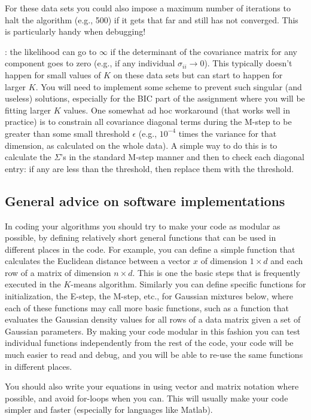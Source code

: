 \documentclass[11pt]{article}
\begin{document}
 
For these data sets you could
also impose a maximum number of iterations to halt the algorithm (e.g.,  
500) if it gets that far and still has not converged. This is particularly
handy when debugging! 

: the likelihood can go to
$\infty$ if the determinant of the covariance matrix for any component goes to zero (e.g., if any
individual $\sigma_{ii} \to 0$). This typically doesn't happen for small values of $K$ on these
data sets but can start to happen  for larger $K$.
You will need to implement some scheme to prevent
such singular (and useless) solutions, especially for the BIC part of the assignment where
you will be fitting larger $K$ values. One somewhat ad hoc workaround (that works well in
practice)   is to constrain all covariance diagonal terms during the M-step to
be greater than some small threshold $\epsilon$ (e.g., $10^{-4}$ times the
variance for that dimension, as calculated on the whole data). A simple way to
do this is to calculate the $\Sigma$'s in the standard M-step manner  and then
to check each diagonal entry: if any are less than the threshold, then replace
them with the threshold.  

\subsection*{General advice on software implementations}
In coding your algorithms you should try to make your code as modular as
possible, by defining relatively short general functions that can be used in
different places in the code. For example, you can define a simple function 
 that calculates the Euclidean distance between a  vector
$x$ of dimension $1 \times d$ and each row of a matrix of dimension $n
\times d$. This is one the basic steps that is frequently executed  in the $K$-means algorithm. Similarly
you can define specific functions for initialization, the E-step, the M-step,
etc., for Gaussian mixtures below, where each of these functions may call more
basic functions, such as a function that evaluates the Gaussian density values for
all rows of a data matrix given a set of Gaussian parameters. By making your code
modular in this fashion you can test individual functions independently from
the rest of the code, your code will be much easier to read and debug, and you
will be able to re-use the same functions in different places.

You should also write your equations in using vector and matrix notation
where possible, and avoid for-loops when you can. This will usually make your code
simpler and faster (especially for languages like Matlab).
\end{document}
